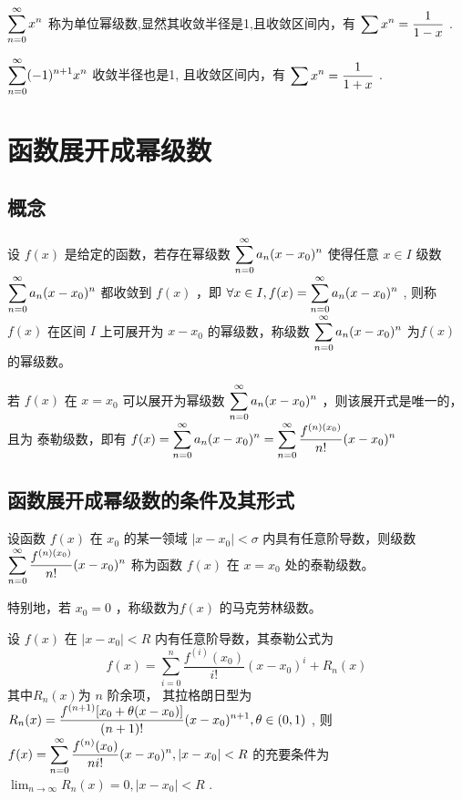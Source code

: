 $ \displaystyle \sum_{n=0}^\infty x^n $ 称为单位幂级数,显然其收敛半径是1,且收敛区间内，有 $ \displaystyle \sum x^n = \dfrac{1}{1-x} $ .

$ \displaystyle \sum_{n=0}^\infty (-1)^{n+1}x^n $ 收敛半径也是1, 且收敛区间内，有 $ \displaystyle \sum x^n = \dfrac{1}{1+x} $ .


\section{函数展开成幂级数}

\subsection{概念}

设 $ f(x) $ 是给定的函数，若存在幂级数 $ \displaystyle \sum_{n=0}^\infty a_n(x-x_0)^n $ 使得任意 $ x\in I $ 
级数 $ \displaystyle \sum_{n=0}^\infty a_n(x-x_0)^n $ 都收敛到 $ f(x) $ ，即 $\displaystyle \forall x\in I, f(x) = \sum_{n=0}^\infty a_n(x-x_0)^n $ ,
则称 $ f(x) $ 在区间 $ I $ 上可展开为 $ x - x_0 $ 的幂级数，称级数 $ \displaystyle \sum_{n=0}^\infty a_n(x-x_0)^n $ 为$ f(x) $ 的幂级数。

\begin{Def}[幂级数展开唯一性]

    若 $ f(x) $ 在 $ x = x_0 $ 可以展开为幂级数 $ \displaystyle \sum_{n=0}^\infty a_n(x-x_0)^n $ ，则该展开式是唯一的，且为
    泰勒级数，即有 $ \displaystyle f(x) = \sum_{n=0}^\infty a_n(x-x_0)^n = \sum_{n=0}^\infty \dfrac{f^{(n)(x_0)}}{n!}(x-x_0)^n$
\end{Def}

\subsection{函数展开成幂级数的条件及其形式}


设函数 $ f(x) $ 在 $ x_0 $ 的某一领域 $ |x-x_0|<\sigma $ 内具有任意阶导数，则级数
$ \displaystyle \sum_{n=0}^\infty \dfrac{f^{(n)(x_0)}}{n!}(x-x_0)^n $ 称为函数 $ f(x) $ 在 $ x = x_0 $ 处的泰勒级数。

特别地，若 $ x_0 = 0 $ ，称级数为$ f(x) $ 的马克劳林级数。


设 $ f(x) $ 在 $ |x-x_0|<R $ 内有任意阶导数，其泰勒公式为$$
    f(x) = \sum_{i=0}^n \dfrac{f^{(i)}(x_0)}{i!}(x-x_0)^i + R_n(x)
$$ 其中$ R_n(x) $为 $ n $ 阶余项，
其拉格朗日型为 $ \displaystyle R_n(x) = \dfrac{f^{(n+1)}[x_0+\theta(x-x_0)]}{(n+1)!}(x-x_0)^{n+1},\theta\in(0,1) $ ,
则 $ \displaystyle f(x) = \sum_{n=0}^\infty \dfrac{f^{(n)}(x_0)}{ni!}(x-x_0)^n,|x-x_0|<R $ 的充要条件为
$ {\displaystyle\lim_{n\rightarrow \infty}}R_n(x) = 0,|x-x_0|<R $ .


